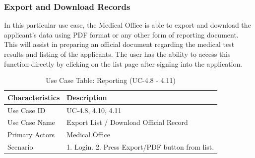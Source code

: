 \subsubsection{Export and Download Records}
In this particular use case, the Medical Office is able to export and download the applicant’s data using PDF format or any other form of reporting document. This will assist in preparing an official document regarding the medical test results and listing of the applicants. The user has the ability to access this function directly by clicking on the list page after signing into the application.
\begin{table}[H]
    \centering
    \small
    \renewcommand{\arraystretch}{1.4}
    \caption{Use Case Table: Reporting (UC-4.8 - 4.11)} %
    \label{tab:reporting-export}
    \begin{tabularx}{\textwidth}{|l|X|}
        \hline
        \rowcolor[gray]{0.9} {Characteristics} & {Description} \\ \hline
        Use Case ID & UC-4.8, 4.10, 4.11 \\ \hline
        Use Case Name & Export List / Download Official Record \\ \hline
        Primary Actors & Medical Office \\ \hline
        Scenario & 1. Login. 2. Press Export/PDF button from list. \\ \hline
    \end{tabularx}
\end{table}
\FloatBarrier
